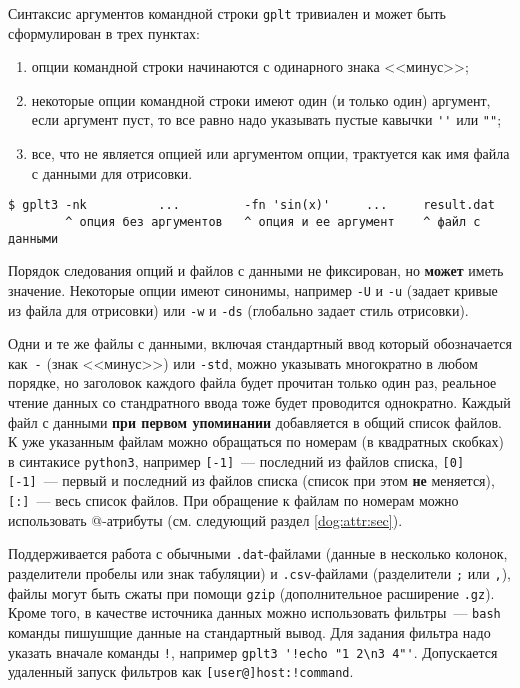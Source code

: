\documentclass[12pt]{article}
\def\gplt{{\tt gplt}}
\def\python{{\tt python3}}
\begin{document}
Синтаксис аргументов командной строки \gplt{} тривиален и может быть сформулирован в трех пунктах:
\begin{enumerate}
\item опции командной строки начинаются с одинарного знака <<минус>>;
\item некоторые опции командной строки имеют один (и только один) аргумент, если аргумент пуст, то все равно надо указывать пустые кавычки \verb|''| или \verb|""|;
\item все, что не является опцией или аргументом опции, трактуется как имя файла с данными для отрисовки.
\end{enumerate}
\begin{verbatim}
$ gplt3 -nk          ...         -fn 'sin(x)'     ...     result.dat
        ^ опция без аргументов   ^ опция и ее аргумент    ^ файл с данными
\end{verbatim}
Порядок следования опций и файлов с данными не фиксирован, но {\bf может} иметь значение.  Некоторые опции имеют синонимы, например \verb'-U' и \verb'-u'
(задает кривые из файла для отрисовки) или \verb'-w' и \verb'-ds' (глобально задает стиль отрисовки).

Одни и те же файлы с данными, включая стандартный ввод который обозначается как~\verb'-' (знак <<минус>>) или \verb'-std', можно указывать многократно в любом порядке,
но заголовок каждого файла будет прочитан только один раз, реальное чтение данных со стандратного ввода тоже будет проводится однократно.
Каждый файл с данными {\bf при первом упоминании} добавляется в общий список файлов. 
К уже указанным файлам можно обращаться по номерам (в квадратных скобках) в синтакисе \python, например \verb'[-1]'~--- последний из файлов списка,
\verb'[0] [-1]'~--- первый и последний из файлов списка (список при этом {\bf не} меняется), \verb'[:]'~--- весь список файлов.
При обращение к файлам по номерам можно использовать @-атрибуты (см. следующий раздел \ref{dog:attr:sec}). 

Поддерживается работа с обычными \verb'.dat'-файлами (данные в несколько колонок, разделители пробелы или знак табуляции) и \verb'.csv'-файлами
(разделители \verb';' или \verb','), файлы могут быть сжаты при помощи \verb'gzip' (дополнительное расширение \verb'.gz').
Кроме того, в качестве источника данных можно использовать фильтры~--- \verb'bash' команды пишушщие данные на стандартный вывод.
Для задания фильтра надо указать вначале команды \verb'!', например \verb|gplt3 '!echo "1 2\n3 4"'|. Допускается удаленный запуск фильтров как \verb'[user@]host:!command'.
\end{document}
